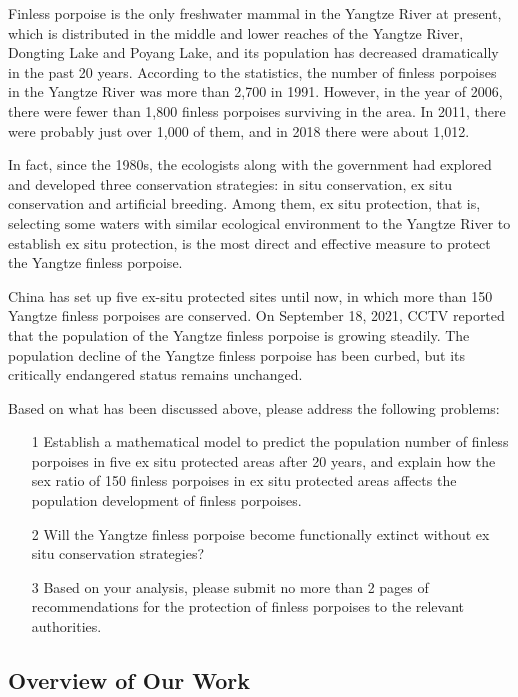 \documentclass{mcmthesis}
\numberwithin{figure}{section}
\numberwithin{table}{section}
\numberwithin{equation}{section}
\begin{document}
Finless porpoise is the only freshwater mammal in the Yangtze River at present, 
which is distributed in the middle and lower reaches of the Yangtze 
River, Dongting Lake and Poyang Lake, and its population has 
decreased dramatically in the past 20 years. According to the statistics, 
the number of finless porpoises in the Yangtze River was more than 2,700 in 1991. 
However, in the year of 2006, there were fewer than 1,800 finless porpoises surviving in the area. 
In 2011, there were probably just over 1,000 of them, and in 2018 there were about 1,012. 
\par
In fact, since the 1980s, the ecologists along with the government
had explored and developed three conservation strategies: 
in situ conservation, ex situ conservation and artificial breeding.
Among them, ex situ protection, that is, selecting some waters with 
similar ecological environment to the Yangtze River to establish 
ex situ protection, is the most direct and effective measure
to protect the Yangtze finless porpoise. 
\par
China has set up five ex-situ protected sites until now, in which 
more than 150 Yangtze finless porpoises are conserved. On September 18, 2021, CCTV reported that 
the population of the Yangtze finless porpoise is growing steadily. 
The population decline of the Yangtze finless porpoise has been 
curbed, but its critically endangered status remains unchanged.
\par
Based on what has been discussed above, please address the following problems:
\begin{enumerate}
  \item [1] Establish a mathematical model to predict the population number of finless porpoises in five ex situ protected areas after 20 years, 
  and explain how the sex ratio of 150 finless porpoises in ex situ protected areas affects the population development of finless porpoises.
  \item [2] Will the Yangtze finless porpoise become functionally extinct without ex situ conservation strategies?
  \item [3] Based on your analysis, please submit no more than 2 pages of recommendations for the protection of finless porpoises to the relevant authorities.
\end{enumerate}

\subsection{Overview of Our Work}
\end{document}
